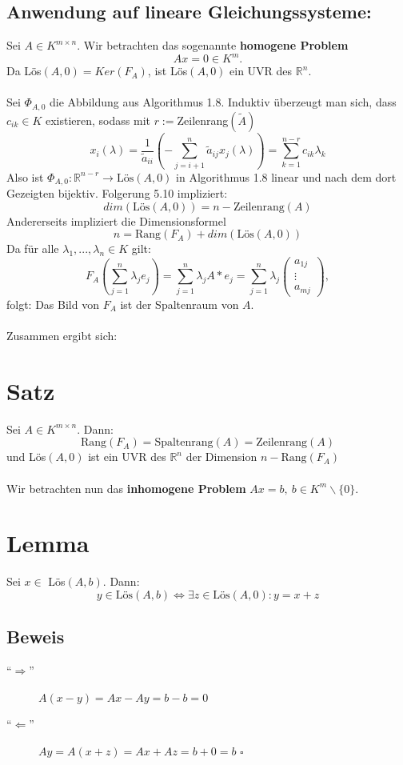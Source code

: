 \documentclass{scrbook}
\begin{document}
\subsection*{Anwendung auf lineare Gleichungssysteme:}
Sei $A \in K^{m\times n}$. Wir betrachten das sogenannte \textbf{homogene Problem}\[Ax=0 \in K^m.\] Da Lös$(A,0) = Ker(F_A)$, ist Lös$(A,0)$ ein UVR des $\mathbb{R}^n$.\\\\
Sei $\Phi_{A,0}$ die Abbildung aus Algorithmus 1.8. Induktiv überzeugt man sich, dass $c_{ik} \in K$ existieren, sodass mit $r:=$Zeilenrang$(\tilde{A})$\[x_i(\lambda) = \dfrac{1}{\tilde{a}_{ii}}(-\sum^n_{j=i+1}\tilde{a}_{ij}x_j(\lambda))= \sum^{n-r}_{k=1} c_{ik}\lambda_k\]
Also ist $\Phi_{A,0}:\mathbb{R}^{n-r} \rightarrow \text{Lös}(A,0)$ in Algorithmus 1.8 linear und nach dem dort Gezeigten bijektiv. Folgerung 5.10 impliziert:\[dim(\text{Lös}(A,0))=n-\text{Zeilenrang}(A)\]
Andererseits impliziert die Dimensionsformel \[n=\text{Rang}(F_A)+dim(\text{Lös}(A,0))\]
Da für alle $\lambda_1,...,\lambda_n\in K$ gilt:\[ F_A(\sum^n_{j=1}\lambda_je_j)= \sum^n_{j=1}\lambda_j A*e_j=\sum^n_{j=1}\lambda_j \left(
\begin{array}{c}
a_{1j}\\ \vdots \\ a_{mj}
\end{array}
\right),
\] folgt: Das Bild von $F_A$ ist der Spaltenraum von $A$.\\\\
Zusammen ergibt sich:
\section{Satz}
Sei $A\in K^{m \times n}$. Dann:
\[\text{Rang}(F_A) = \text{Spaltenrang}(A)= \text{Zeilenrang}(A)\]
und Lös$(A,0)$ ist ein UVR des $\mathbb{R}^n$ der Dimension $n-\text{Rang}(F_A)$\\\\
Wir betrachten nun das \textbf{inhomogene Problem} $Ax=b,\ b\in K^m\backslash\{0\}$.
\section{Lemma} Sei $x \in $ Lös$(A,b)$. Dann:\[y\in \text{Lös}(A,b) \Leftrightarrow \exists z \in \text{Lös}(A,0): y = x+z\]
\subsection*{Beweis}
\begin{description}
\item["`$\Rightarrow$"'] $A(x-y) = Ax-Ay = b-b = 0$
\item["`$\Leftarrow$"'] $Ay=A(x+z) = Ax+Az = b+0 = b$ $\square$
\end{description}
\end{document}
